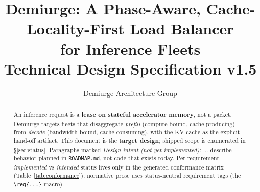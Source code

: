 \documentclass[11pt]{article}
\title{Demiurge: A Phase-Aware, Cache-Locality-First Load Balancer\\for Inference Fleets\\[4pt]
  \large Technical Design Specification v1.5}
\author{Demiurge Architecture Group}
\date{}
\newcommand{\intent}[1]{\textit{Design intent (not yet implemented):} #1}
\begin{document}
\maketitle

\begin{abstract}
An inference request is a \textbf{lease on stateful accelerator memory}, not a
packet. Demiurge targets fleets that disaggregate \emph{prefill} (compute-bound,
cache-producing) from \emph{decode} (bandwidth-bound, cache-consuming), with the
KV cache as the explicit hand-off artifact. This document is the \textbf{target
design}; shipped scope is enumerated in \S\ref{sec:status}. Paragraphs marked
\intent{...} describe behavior planned in \texttt{ROADMAP.md}, not code that
exists today. Per-requirement \emph{implemented} vs \emph{intended} status lives
only in the generated conformance matrix (Table~\ref{tab:conformance}); normative
prose uses status-neutral requirement tags (the \texttt{\textbackslash req\{...\}} macro).
\end{abstract}
\end{document}
